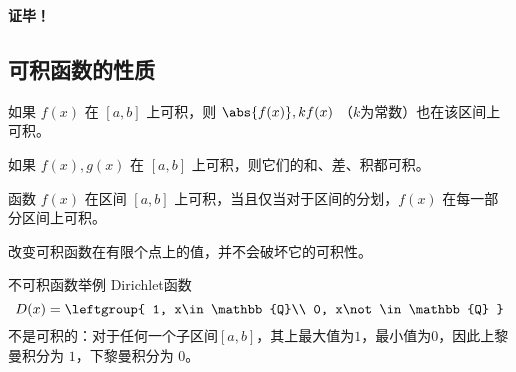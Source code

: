 \textbf{证毕！}

\subsection{可积函数的性质}

\begin{theorem}{}
如果 $f(x)$ 在 $[a,b]$ 上可积，则 $\abs{f(x)},kf(x)$ （$k$为常数）也在该区间上可积。
\end{theorem}
\begin{theorem}{}
如果 $f(x),g(x)$ 在 $[a,b]$ 上可积，则它们的和、差、积都可积。
\end{theorem}

\begin{theorem}{}\label{the_InFun_1}
函数 $f(x)$ 在区间 $[a,b]$ 上可积，当且仅当对于区间的分划，$f(x)$ 在每一部分区间上可积。
\end{theorem}

\begin{theorem}{}
改变可积函数在有限个点上的值，并不会破坏它的可积性。
\end{theorem}

\begin{example}{不可积函数举例}
Dirichlet函数
\begin{equation}
D(x)=
\leftgroup{
    1, x\in\mathbb{Q}\\
    0, x\not\in\mathbb{Q}
}
\end{equation}
不是可积的：对于任何一个子区间$[a, b]$，其上最大值为$1$，最小值为$0$，因此上黎曼积分为 $1$，下黎曼积分为 $0$。
\end{example}